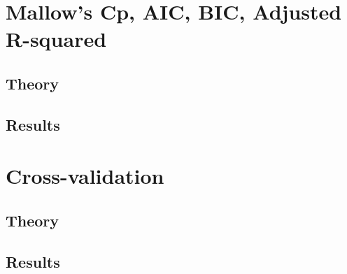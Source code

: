 \section{Mallow's Cp, AIC, BIC, Adjusted R-squared}
\subsection{Theory}
\subsection{Results}

\section{Cross-validation}
\subsection{Theory}
\subsection{Results}